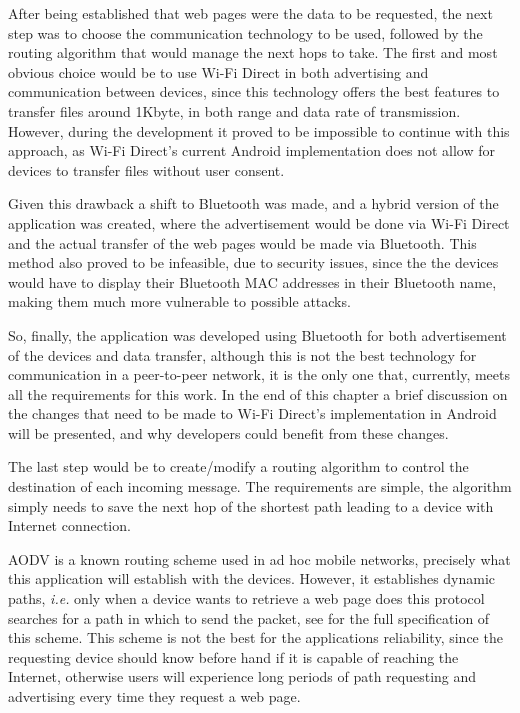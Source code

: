 After being established that web pages were the data to be requested, the next step was to choose the communication technology to be used, followed by the routing algorithm that would manage the next hops to take. The first and most obvious choice would be to use Wi-Fi Direct in both advertising and communication between devices, since this technology offers the best features to transfer files around 1Kbyte, in both range and data rate of transmission. However, during the development it proved to be impossible to continue with this approach, as Wi-Fi Direct's current Android implementation does not allow for devices to transfer files without user consent.

Given this drawback a shift to Bluetooth was made, and a hybrid version of the application was created, where the advertisement would be done via Wi-Fi Direct and the actual transfer of the web pages would be made via Bluetooth. This method also proved to be infeasible, due to security issues, since the the devices would have to display their Bluetooth MAC addresses in their Bluetooth name, making them much more vulnerable to possible attacks.

So, finally, the application was developed using Bluetooth for both advertisement of the devices and data transfer, although this is not the best technology for communication in a peer-to-peer network, it is the only one that, currently, meets all the requirements for this work. In the end of this chapter a brief discussion on the changes that need to be made to Wi-Fi Direct's implementation in Android will be presented, and why developers could benefit from these changes.

The last step would be to create/modify a routing algorithm to control the destination of each incoming message. The requirements are simple, the algorithm simply needs to save the next hop of the shortest path leading to a device with Internet connection.

\gls{AODV} is a known routing scheme used in ad hoc mobile networks, precisely what this application will establish with the devices. However, it establishes dynamic paths, \textit{i.e.} only when a device wants to retrieve a web page does this protocol searches for a path in which to send the packet, see \cite{aodv} for the full specification of this scheme. This scheme is not the best for the applications reliability, since the requesting device should know before hand if it is capable of reaching the Internet, otherwise users will experience long periods of path requesting and advertising every time they request a web page.

